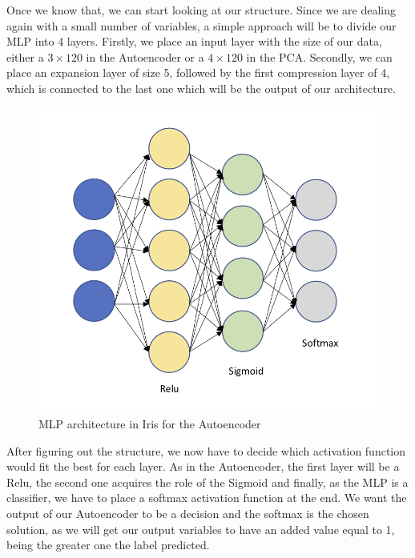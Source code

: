 Once we know that, we can start looking at our structure. Since we are dealing again with a small number of variables, a simple approach will be to divide our MLP into 4 layers. Firstly, we place an input layer with the size of our data, either a $3\times120$ in the Autoencoder or a $4\times120$ in the PCA. Secondly, we can place an expansion layer of size 5, followed by the first compression layer of 4, which is connected to the last one which will be the output of our architecture. \par
%
\begin{figure}[H]
	\includegraphics[width=0.8\linewidth]{Figuras_tfg/Example_MLP_Auto.png}
	\caption{MLP architecture in Iris for the Autoencoder}
	\label{fig:figure_MLP_Iris_Autoencoder}
\end{figure}

After figuring out the structure, we now have to decide which activation function would fit the best for each layer. As in the Autoencoder, the first layer will be a Relu, the second one acquires the role of the Sigmoid and finally, as the MLP is a classifier, we have to place a softmax activation function at the end. We want the output of our Autoencoder to be a decision and the softmax is the chosen solution, as we will get our output variables to have an added value equal to 1, being the greater one the label predicted. \par


